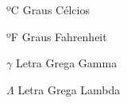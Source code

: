 \begin{simbolos}
	\item[ºC] Graus Célcios
	\item[ºF] Graus Fahrenheit
	\item[$\gamma$] Letra Grega Gamma
	\item[$\Lambda$] Letra Grega Lambda
\end{simbolos}
